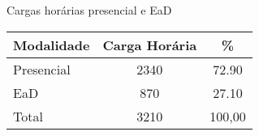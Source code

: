 \begin{quadro}[ht!]
\caption{Cargas horárias presencial e EaD }
\label{quad:ead}
\centering
\begin{tabular}{|l|c|c|}
\hline
\rowcolor{blue1}
 Modalidade &    Carga Horária  & \%\\
\hline
Presencial & 2340 & 72.90 \\
EaD & 870 & 27.10 \\
\hline
Total  & 3210 & 100,00\\\hline
\end{tabular}
\end{quadro}